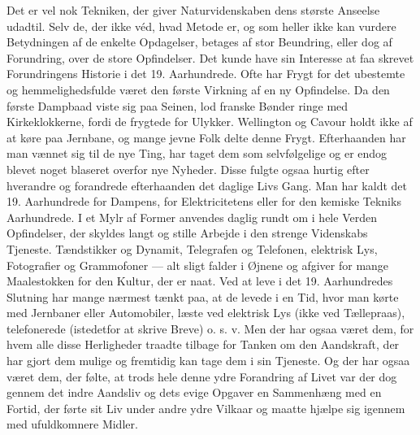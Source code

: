 \documentclass[12pt,a4paper,openany]{book}
\newcommand{\opage}[1]{\marginnote{\footnotesize\textit{[#1]}}}
\begin{document}
Det er vel nok Tekniken, der giver Naturvidenskaben dens største
Anseelse udadtil. Selv de, der ikke véd, hvad Metode er, og som heller
ikke kan vurdere Betydningen af de enkelte Opdagelser, betages
\opage{43}af stor Beundring, eller dog af Forundring, over de store Opfindelser.
Det kunde have sin Interesse at faa skrevet Forundringens Historie i
det 19. Aarhundrede. Ofte har Frygt for det ubestemte og hemmelighedsfulde
været den første Virkning af en ny Opfindelse. Da den første
Dampbaad viste sig paa Seinen, lod franske Bønder ringe med Kirkeklokkerne,
fordi de frygtede for Ulykker. Wellington og Cavour holdt
ikke af at køre paa Jernbane, og mange jevne Folk delte denne Frygt.
Efterhaanden har man vænnet sig til de nye Ting, har taget dem som
selvfølgelige og er endog blevet noget blaseret overfor nye Nyheder.
Disse fulgte ogsaa hurtig efter hverandre og forandrede efterhaanden
det daglige Livs Gang. Man har kaldt det 19. Aarhundrede for
Dampens, for Elektricitetens eller for den kemiske Tekniks Aarhundrede.
I et Mylr af Former anvendes daglig rundt om i hele Verden
Opfindelser, der skyldes langt og stille Arbejde i den strenge
Videnskabs Tjeneste. Tændstikker og Dynamit, Telegrafen og Telefonen,
elektrisk Lys, Fotografier og Grammofoner --- alt sligt falder
i Øjnene og afgiver for mange Maalestokken for den Kultur, der er
naat. Ved at leve i det 19. Aarhundredes Slutning har mange nærmest
tænkt paa, at de levede i en Tid, hvor man kørte med Jernbaner
eller Automobiler, læste ved elektrisk Lys (ikke ved Tællepraas),
telefonerede (istedetfor at skrive Breve) o. s. v. Men der har
ogsaa været dem, for hvem alle disse Herligheder traadte tilbage for
Tanken om den Aandskraft, der har gjort dem mulige og fremtidig
kan tage dem i sin Tjeneste. Og der har ogsaa været dem, der følte,
at trods hele denne ydre Forandring af Livet var der dog gennem
det indre Aandsliv og dets evige Opgaver en Sammenhæng med en
Fortid, der førte sit Liv under andre ydre Vilkaar og maatte hjælpe
sig igennem med ufuldkomnere Midler.
\end{document}

